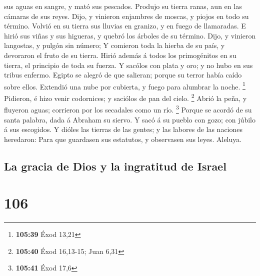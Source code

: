 sus aguas en sangre, y mató sus pescados.  Produjo su
tierra ranas, aun en las cámaras de sus reyes.  Dijo, y
vinieron enjambres de moscas, y piojos en todo su término. 
Volvió en su tierra sus lluvias en granizo, y en fuego de llamaradas.
 E hirió sus viñas y sus higueras, y quebró los árboles de
su término.  Dijo, y vinieron langostas, y pulgón sin
número;  Y comieron toda la hierba de su país, y devoraron
el fruto de su tierra.  Hirió además á todos los
primogénitos en su tierra, el principio de toda su fuerza. 
Y sacólos con plata y oro; y no hubo en sus tribus enfermo.
 Egipto se alegró de que salieran; porque su terror había
caído sobre ellos.  Extendió una nube por cubierta, y fuego
para alumbrar la noche. \footnote{\textbf{105:39} Éxod 13,21}
 Pidieron, é hizo venir codornices; y saciólos de pan del
cielo. \footnote{\textbf{105:40} Éxod 16,13-15; Juan 6,31} 
Abrió la peña, y fluyeron aguas; corrieron por los secadales como un
río. \footnote{\textbf{105:41} Éxod 17,6}  Porque se acordó
de su santa palabra, dada á Abraham su siervo.  Y sacó á su
pueblo con gozo; con júbilo á sus escogidos.  Y dióles las
tierras de las gentes; y las labores de las naciones heredaron:
 Para que guardasen sus estatutos, y observasen sus leyes.
Aleluya.

\hypertarget{la-gracia-de-dios-y-la-ingratitud-de-israel}{%
\subsection{La gracia de Dios y la ingratitud de
Israel}\label{la-gracia-de-dios-y-la-ingratitud-de-israel}}

\hypertarget{section-105}{%
\section{106}\label{section-105}}

